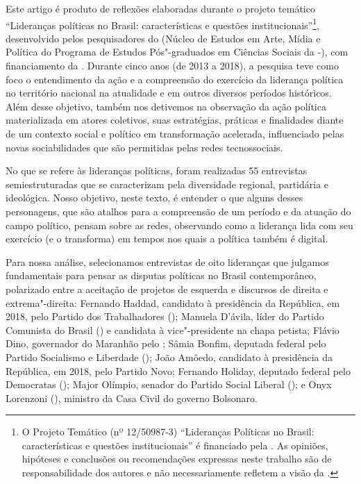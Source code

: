 Este artigo é produto de reflexões elaboradas durante o projeto temático
``Lideranças políticas no Brasil: características e questões
institucionais''\footnote{O Projeto Temático (nº 12/50987-3)
  ``Lideranças Políticas no Brasil: características e questões
  institucionais'' é financiado pela . As opiniões, hipóteses e
  conclusões ou recomendações expressas neste trabalho são de
  responsabilidade dos autores e não necessariamente refletem a visão da
  .}, desenvolvido pelos pesquisadores do  (Núcleo de Estudos
em Arte, Mídia e Política do Programa de Estudos Pós"-graduados em
Ciências Sociais da -), com financiamento da . Durante cinco
anos (de 2013 a 2018), a pesquisa teve como foco o entendimento da ação
e a compreensão do exercício da liderança política no território
nacional na atualidade e em outros diversos períodos históricos. Além
desse objetivo, também nos detivemos na observação da ação política
materializada em atores coletivos, suas estratégias, práticas e
finalidades diante de um contexto social e político em transformação
acelerada, influenciado pelas novas sociabilidades que são permitidas
pelas redes tecnossociais.

No que se refere às lideranças políticas, foram realizadas 55
entrevistas semiestruturadas que se caracterizam pela diversidade
regional, partidária e ideológica. Nosso objetivo, neste texto, é
entender o que alguns desses personagens, que são atalhos para a
compreensão de um período e da atuação do campo político, pensam sobre
as redes, observando como a liderança lida com seu exercício (e o
transforma) em tempos nos quais a política também é digital.

Para nossa análise, selecionamos entrevistas de oito lideranças que
julgamos fundamentais para pensar as disputas políticas no Brasil
contemporâneo, polarizado entre a aceitação de projetos de esquerda e
discursos de direita e extrema"-direita: Fernando Haddad, candidato à
presidência da República, em 2018, pelo Partido dos Trabalhadores ();
Manuela D'ávila, líder do Partido Comunista do Brasil () e
candidata à vice"-presidente na chapa petista; Flávio Dino, governador do
Maranhão pelo ; Sâmia Bonfim, deputada federal pelo Partido
Socialismo e Liberdade (); João Amôedo, candidato à presidência da
República, em 2018, pelo Partido Novo; Fernando Holiday, deputado
federal pelo Democratas (); Major Olímpio, senador do Partido Social
Liberal (); e Onyx Lorenzoni (), ministro da Casa Civil do governo
Bolsonaro.

